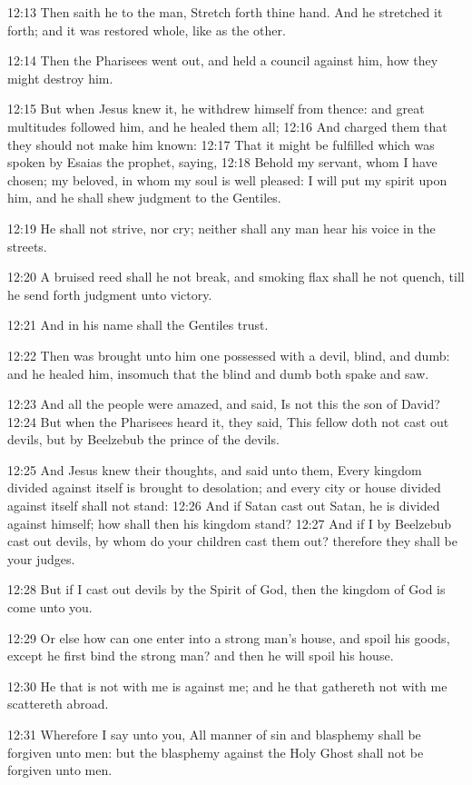 12:13 Then saith he to the man, Stretch forth thine hand. And he stretched it forth; and it was restored whole, like as the other.

12:14 Then the Pharisees went out, and held a council against him, how they might destroy him.

12:15 But when Jesus knew it, he withdrew himself from thence: and great multitudes followed him, and he healed them all; 12:16 And charged them that they should not make him known: 12:17 That it might be fulfilled which was spoken by Esaias the prophet, saying, 12:18 Behold my servant, whom I have chosen; my beloved, in whom my soul is well pleased: I will put my spirit upon him, and he shall shew judgment to the Gentiles.

12:19 He shall not strive, nor cry; neither shall any man hear his voice in the streets.

12:20 A bruised reed shall he not break, and smoking flax shall he not quench, till he send forth judgment unto victory.

12:21 And in his name shall the Gentiles trust.

12:22 Then was brought unto him one possessed with a devil, blind, and dumb: and he healed him, insomuch that the blind and dumb both spake and saw.

12:23 And all the people were amazed, and said, Is not this the son of David?  12:24 But when the Pharisees heard it, they said, This fellow doth not cast out devils, but by Beelzebub the prince of the devils.

12:25 And Jesus knew their thoughts, and said unto them, Every kingdom divided against itself is brought to desolation; and every city or house divided against itself shall not stand: 12:26 And if Satan cast out Satan, he is divided against himself; how shall then his kingdom stand?  12:27 And if I by Beelzebub cast out devils, by whom do your children cast them out? therefore they shall be your judges.

12:28 But if I cast out devils by the Spirit of God, then the kingdom of God is come unto you.

12:29 Or else how can one enter into a strong man's house, and spoil his goods, except he first bind the strong man? and then he will spoil his house.

12:30 He that is not with me is against me; and he that gathereth not with me scattereth abroad.

12:31 Wherefore I say unto you, All manner of sin and blasphemy shall be forgiven unto men: but the blasphemy against the Holy Ghost shall not be forgiven unto men.

